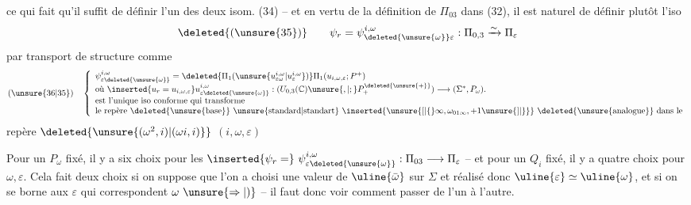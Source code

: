 ce qui fait qu'il suffit de définir l'un des deux isom. (34) -- et en vertu de la définition de $\Pi_{03}$ dans (32), il est naturel de définir plutôt l'iso
\[
\deleted{(\unsure{35})}\qquad\psi_r=\psi_{\deleted{\unsure{\omega}}\varepsilon}^{i,\omega}:\Pi_{0,3}\xrightarrow{\sim}\Pi_\varepsilon
\]
par transport de structure comme
\[
(\unsure{36|35})\quad\left\{\begin{array}{l}
\psi_{\varepsilon\deleted{\unsure{\omega}}}^{i,\omega}=\deleted{\Pi_1(\unsure{u_{\varepsilon\omega}^{i,\omega}|u_\varepsilon^{i,\omega}})}\Pi_1(u_{i,\omega,\varepsilon};P^+)\\
\text{où }\inserted{u_r=u_{i,\omega,\varepsilon}} u_{\varepsilon\deleted{\unsure{\omega}}}^{i,\omega}:(U_{0,3}(\mathbb C)\unsure{,|;}P^{\deleted{\unsure{+}}}_{+})\longrightarrow(\Sigma^*,P_\omega).\\
\text{est l'unique iso conforme qui transforme}\\
\text{le repère \deleted{\unsure{base}} }\text{\unsure{standard|standart}}\ \inserted{\unsure{[|\{}\infty,\omega_{01\infty},+1\unsure{]|\}}}\ \text{\deleted{\unsure{analogue}} dans le}
\end{array}\right.
\]
repère $\deleted{\unsure{(\omega^2,i)|(\omega i,i)}}$ $(i,\omega,\varepsilon)$

Pour un $P_\omega$ fixé, il y a six choix pour les $\inserted{\psi_r=}\ \psi_{\varepsilon\deleted{\unsure{\omega}}}^{i,\omega}:\Pi_{03}\longrightarrow\Pi_\varepsilon$ -- et pour un $Q_i$ fixé, il y a quatre choix pour $\omega,\varepsilon$. Cela fait  deux choix si on suppose que l'on a choisi une valeur de $\uline{\bar\omega}$ sur $\Sigma$ et réalisé donc $\uline{\varepsilon}\simeq\uline{\omega}$, et si on se borne aux $\varepsilon$ qui correspondent  $\omega\ \unsure{\Rightarrow|)}$ -- il faut donc voir comment passer de l'un  à l'autre.

